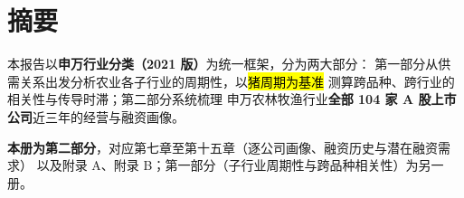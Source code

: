 \section*{摘要}

\begin{keybox}[报告要点]
\small
本报告以\textbf{申万行业分类（2021 版）}为统一框架，分为两大部分：
第一部分从供需关系出发分析农业各子行业的周期性，以\hl{猪周期为基准}
测算跨品种、跨行业的相关性与传导时滞；第二部分系统梳理
申万农林牧渔行业\textbf{全部 \num{104} 家 A 股上市公司}近三年的经营与融资画像。

\textbf{本册为第二部分}，对应第七章至第十五章（逐公司画像、融资历史与潜在融资需求）
以及附录 A、附录 B；第一部分（子行业周期性与跨品种相关性）为另一册。


\end{keybox}
